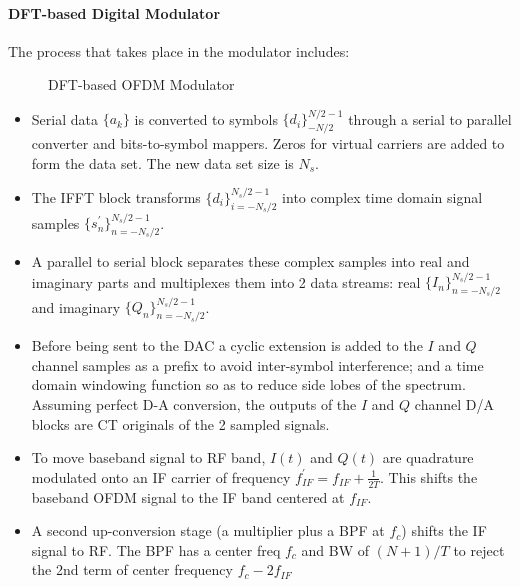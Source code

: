\paragraph{\gls{DFT}-based Digital Modulator}
The process that takes place in the modulator includes\cite{fuqin}:
\begin{figure}[h!]
	\centerline{\resizebox{16cm}{!}{}}
	\caption{DFT-based OFDM Modulator}
	\label{fig:dft_mod}
\end{figure}
\begin{itemize}
	\item Serial data $\{ a_k\}$ is converted to symbols  $\{ d_i\}_{-N/2}^{N/2-1}$ through a serial to parallel converter and bits-to-symbol mappers. Zeros for virtual carriers are added to form the data set. The new data set size is $N_s$.
	\item The \gls{IFFT} block transforms $\{ d_i\}_{i=-N_s/2}^{N_s/2-1}$ into complex time domain signal samples $\{ s_n^\prime\}_{n=-N_s/2}^{N_s/2-1}$.
	\item A parallel to serial block separates these complex samples into real and imaginary parts and multiplexes them into 2 data streams: real $\{ I_n\}_{n=-N_s/2}^{N_s/2-1}$ and imaginary $\{ Q_n\}_{n=-N_s/2}^{N_s/2-1}$.
	\item Before being sent to the DAC a cyclic extension is added to the $I$ and $Q$ channel samples as a prefix to avoid inter-symbol interference; and a time domain windowing function so as to reduce side lobes of the spectrum. Assuming perfect D-A conversion, the outputs of the $I$ and $Q$ channel D/A blocks are CT originals of the 2 sampled signals.
	\item To move baseband signal to RF band, $I(t)$ and $Q(t)$ are quadrature modulated onto an \gls{IF} carrier of frequency $f_{IF}^\prime = f_{IF} + \frac{1}{2T}$. This shifts the baseband OFDM signal to the \gls{IF} band centered at $f_{IF}$.
	\item A second up-conversion stage (a multiplier plus a \gls{BPF} at $f_c$) shifts the \gls{IF} signal to RF. The \gls{BPF} has a center freq $f_c$ and BW of $(N+1)/T$ to reject the 2nd term of center frequency $f_c-2f_{IF}$
\end{itemize}

